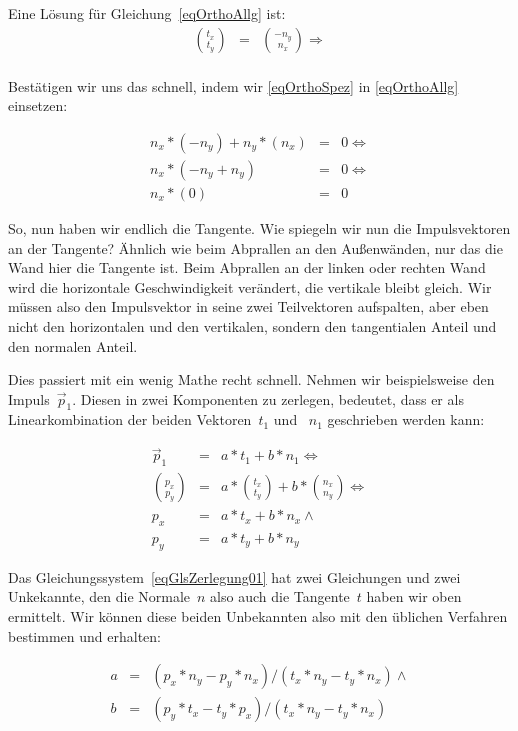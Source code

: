 Eine Lösung für Gleichung~\ref{eqOrthoAllg} ist:
\begin{eqnarray}
	{t_x \choose t_y} & = & {-n_y \choose n_x}\Longrightarrow \label{eqOrthoSpez} \\
\end{eqnarray}

Bestätigen wir uns das schnell, indem wir \ref{eqOrthoSpez} in \ref{eqOrthoAllg} einsetzen:

\begin{eqnarray}
    n_x * (-n_y) + n_y * (n_x) & = & 0 \Longleftrightarrow \nonumber \\
    n_x * (-n_y + n_y) & = & 0 \Longleftrightarrow \nonumber\\
    n_x * (0) & = & 0 \nonumber
\end{eqnarray}

So, nun haben wir endlich die Tangente. Wie spiegeln wir nun die Impulsvektoren an der Tangente? Ähnlich wie beim Abprallen an den Außenwänden, nur das die Wand hier die Tangente ist. Beim Abprallen an der linken oder rechten Wand wird die horizontale Geschwindigkeit verändert, die vertikale bleibt gleich. Wir müssen also den Impulsvektor in seine zwei Teilvektoren aufspalten, aber eben nicht den horizontalen und den vertikalen, sondern den tangentialen Anteil und den normalen Anteil.

Dies passiert mit ein wenig Mathe recht schnell. Nehmen wir beispielsweise den Impuls~$\vec{p}_1$. Diesen in zwei Komponenten zu zerlegen, bedeutet, dass er als Linearkombination der beiden Vektoren~$t_1$ und ~$n_1$ geschrieben werden kann:

\begin{eqnarray}
    \vec{p}_1 & = & a * t_1 + b * n_1 \Longleftrightarrow \nonumber \\
    {p_x \choose p_y} & = & a * {t_x \choose t_y} + b * {n_x \choose n_y} \Longleftrightarrow \nonumber\\
    p_x & = & a * t_x + b * n_x \wedge \label{eqGlsZerlegung01}\\
    p_y & = & a * t_y + b * n_y  \nonumber
\end{eqnarray}

Das Gleichungssystem~\ref{eqGlsZerlegung01} hat zwei Gleichungen und zwei Unkekannte, den die Normale~$n$ also auch die Tangente~$t$ haben wir oben ermittelt. Wir können diese beiden Unbekannten also mit den üblichen Verfahren bestimmen und erhalten:

\begin{eqnarray}
    a & = & (p_x * n_y - p_y * n_x) / (t_x * n_y - t_y * n_x) \wedge \label{eqGlsZerlegung02} \\
    b & = & (p_y * t_x - t_y * p_x) / (t_x * n_y - t_y * n_x) \label{eqGlsZerlegung03}
\end{eqnarray}

